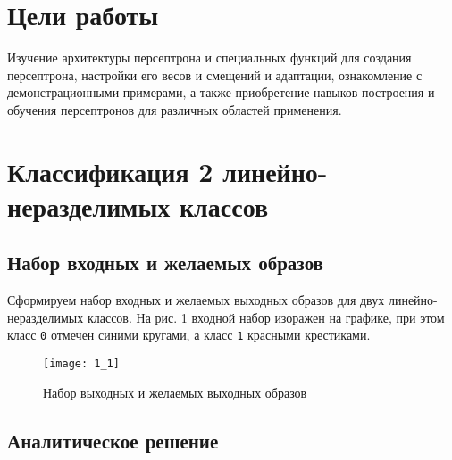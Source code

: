 





\tableofcontents
\newpage
\listoffigures
\newpage

\section{Цели работы}

Изучение архитектуры персептрона и специальных функций для создания персептрона, настройки его весов и смещений и адаптации, ознакомление с демонстрационными примерами, а так­же приобретение навыков построения и обучения персептронов для различных областей применения.

\section{Классификация 2 линейно-неразделимых классов}

\subsection{Набор входных и желаемых образов}


Сформируем набор входных и желаемых выходных образов для двух линейно-неразделимых классов. На рис. \ref{fig:1_1} входной набор изоражен на графике, при этом класс \verb+0+ отмечен синими кругами, а класс \verb+1+ красными крестиками.

\begin{figure}[H]
\begin{center}
	\texttt{[image: 1\_1]}
	\caption{Набор выходных и желаемых выходных образов}
	\label{fig:1_1}
\end{center}
\end{figure}

\subsection{Аналитическое решение}


